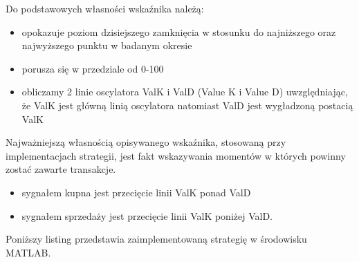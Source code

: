\noindent Do podstawowych własności wskaźnika należą:
\begin{itemize}
\item opokazuje poziom dzisiejszego zamknięcia w stosunku do najniższego oraz najwyższego punktu w badanym okresie
\item porusza się w przedziale od 0-100
\item obliczamy 2 linie oscylatora ValK i ValD (Value K i Value D) uwzględniając, że ValK jest główną linią oscylatora natomiast ValD jest wygładzoną postacią ValK
\end{itemize}
Najważniejszą własnością opisywanego wskaźnika, stosowaną przy implementacjach strategii, jest fakt wskazywania momentów w których powinny zostać zawarte transakcje. 
\begin{itemize}
\item sygnałem kupna jest przecięcie linii ValK ponad ValD
\item sygnałem sprzedaży jest przecięcie linii ValK poniżej ValD.

\end{itemize}
\noindent Poniższy listing przedstawia zaimplementowaną strategię w środowisku MATLAB.
